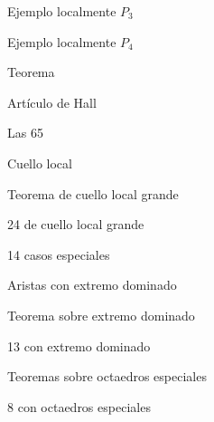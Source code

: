 \documentclass[spanish,mexico]{beamer}
\begin{document}
\begin{frame}[label=sec-16]{Ejemplo localmente \(P_{3}\)}

\end{frame}
\begin{frame}[label=sec-17]{Ejemplo localmente \(P_{4}\)}

\end{frame}
\begin{frame}[label=sec-18]{Teorema}

\end{frame}
\begin{frame}[label=sec-19]{Artículo de Hall}

\end{frame}
\begin{frame}[label=sec-20]{Las 65}

\end{frame}
\begin{frame}[label=sec-21]{Cuello local}

\end{frame}
\begin{frame}[label=sec-22]{Teorema de cuello local grande}

\end{frame}
\begin{frame}[label=sec-23]{24 de cuello local grande}
\end{frame}
\begin{frame}[label=sec-24]{14 casos especiales}

\end{frame}
\begin{frame}[label=sec-25]{Aristas con extremo dominado}

\end{frame}
\begin{frame}[label=sec-26]{Teorema sobre extremo dominado}

\end{frame}
\begin{frame}[label=sec-27]{13 con extremo dominado}

\end{frame}
\begin{frame}[label=sec-28]{Teoremas sobre octaedros especiales}

\end{frame}
\begin{frame}[label=sec-29]{8 con octaedros especiales}

\end{frame}
\end{document}
